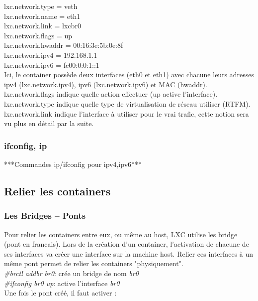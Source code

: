 \documentclass[twoside]{article}
\begin{document}
\noindent
lxc.network.type = veth\\
lxc.network.name = eth1\\
lxc.network.link = lxcbr0\\
lxc.network.flags = up\\
lxc.network.hwaddr = 00:16:3e:5b:0e:8f\\
lxc.network.ipv4 = 192.168.1.1\\
lxc.network.ipv6 = fc00:0:0:1::1\\

Ici, le container poss\`ede deux interfaces (eth0 et eth1) avec chacune leurs adresses ipv4 (lxc.network.ipv4),
ipv6 (lxc.network.ipv6) et MAC (hwaddr).\\
lxc.network.flags indique quelle action effectuer (up active l'interface).\\
lxc.network.type indique quelle type de virtualisation de réseau utiliser (RTFM).\\
lxc.network.link indique l'interface \`a utiliser pour le vrai trafic, cette notion sera vu plus en d\'etail par la suite.\\

\subsubsection{ifconfig, ip}

***Commandes ip/ifconfig pour ipv4,ipv6***

\subsection{Relier les containers}
\subsubsection{Les Bridges -- Ponts}

Pour relier les containers entre eux, ou m\^eme au host, LXC utilise les bridge (pont en francais). Lors de
la cr\'eation d'un container, l'activation de chacune de ses interfaces va cr\'eer une interface sur la machine
host. Relier ces interfaces \`a un m\^eme pont permet de relier les containers "physiquement".\\

\noindent
\emph{\#brctl addbr br0}: cr\'ee un bridge de nom \emph{br0}\\
\emph{\#ifconfig br0 up}: active l'interface \emph{br0}\\

\noindent
Une fois le pont cr\'e\'e, il faut activer :
\end{document}
